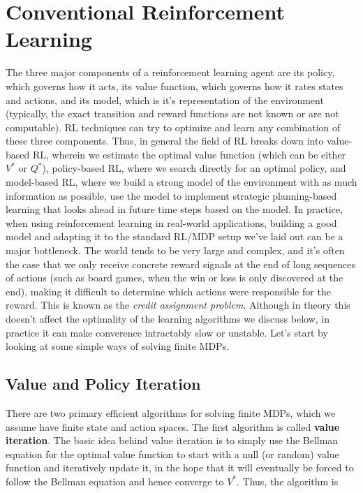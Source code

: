 \documentclass{article}
\begin{document}
\section{Conventional Reinforcement Learning}
The three major components of a reinforcement learning agent are its policy, which governs how it acts, its value function, which governs how it rates states and actions, and its model, which is it's representation of the environment (typically, the exact transition and reward functions are not known or are not computable). RL techniques can try to optimize and learn any combination of these three components. Thus, in general the field of RL breaks down into value-based RL, wherein we estimate the optimal value function (which can be either $ V^* $ or $ Q^* $), policy-based RL, where we search directly for an optimal policy, and model-based RL, where we build a strong model of the environment with as much information as possible, use the model to implement strategic planning-based learning that looks ahead in future time steps based on the model. In practice, when using reinforcement learning in real-world applications, building a good model and adapting it to the standard RL/MDP setup we've laid out can be a major bottleneck. The world tends to be very large and complex, and it's often the case that we only receive concrete reward signals at the end of long sequences of actions (such as board games, when the win or loss is only discovered at the end), making it difficult to determine which actions were responsible for the reward. This is known as the \textit{credit assignment problem}. Although in theory this doesn't affect the optimality of the learning algorithms we discuss below, in practice it can make converence intractably slow or unstable. Let's start by looking at some simple ways of solving finite MDPs.

\subsection{Value and Policy Iteration}
There are two primary efficient algorithms for solving finite MDPs, which we assume have finite state and action spaces. The first algorithm is called \textbf{value iteration}. The basic idea behind value iteration is to simply use the Bellman equation for the optimal value function to start with a null (or random) value function and iteratively update it, in the hope that it will eventually be forced to follow the Bellman equation and hence converge to $ V^* $. Thus, the algorithm is
\end{document}
